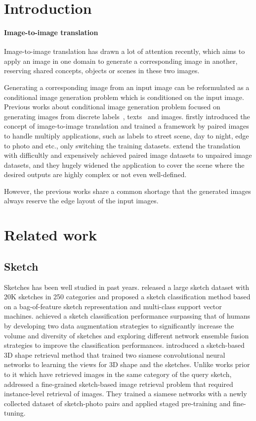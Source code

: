 \section{Introduction}
\paragraph{Image-to-image translation}
Image-to-image translation has drawn a lot of attention recently, which aims to apply an image in one domain to generate a corresponding image in another, reserving shared concepts, objects or scenes in these two images.  
 
Generating a corresponding image from an input image can be reformulated as a conditional image generation problem which is conditioned on the input image. Previous works about conditional image generation problem focused on generating images from discrete labels~\cite{CGAN}, texts~\cite{reed1, reed2} and images.
\cite{pix2pix} firstly introduced the concept of image-to-image translation and trained a framework by paired images to handle multiply applications, such as labels to street scene, day to night, edge to photo and etc., only switching the training datasets.
%
\cite{a,b,c,d} extend the translation with difficultly and expensively achieved paired image datasets to unpaired image datasets, and they hugely widened the application to cover the scene where the desired outputs are highly complex or not even well-defined.

However, the previous works share a common shortage that the generated images always reserve the edge layout of the input images. 




\section{Related work}
\subsection{Sketch}
Sketches has been well studied in past years. \cite{HowSketch} released a large sketch dataset with 20K sketches in 250 categories and proposed a sketch classification method based on a bag-of-feature sketch representation and multi-class support vector machines. 
%
\cite{SketchANet} achieved a sketch classification performance surpassing that of humans by developing two data augmentation strategies to significantly increase the volume and diversity of sketches and exploring different network ensemble fusion strategies to improve the classification performances.
\cite{sketch3dshape} introduced a sketch-based 3D shape retrieval method that trained two siamese convolutional neural networks to learning the views for 3D shape and the sketches.
Unlike works prior to it which have retrieved images in the same category of the query sketch, \cite{sketchmethatshoe} addressed a fine-grained sketch-based image retrieval problem that required instance-level retrieval of images. They trained a siamese networks with a newly collected dataset of sketch-photo pairs and applied staged pre-training and fine-tuning.

